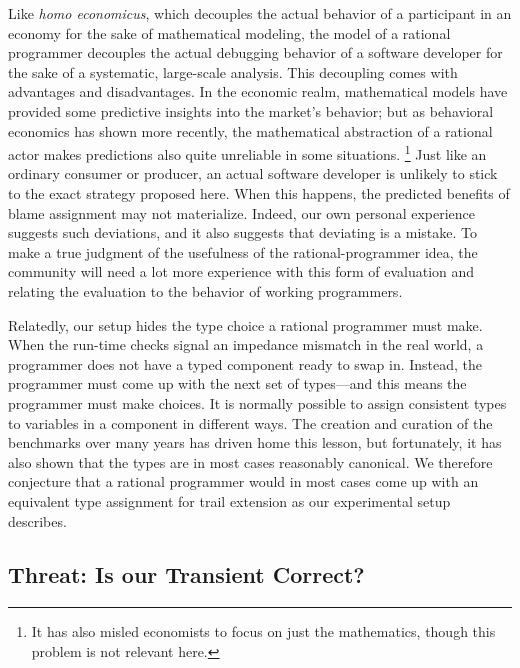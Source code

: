 Like {\em homo economicus\/}, which decouples the actual behavior of a
participant in an economy for the sake of mathematical modeling, the model of a
rational programmer decouples the actual debugging behavior of a software
developer for the sake of a systematic, large-scale analysis. This decoupling
comes with advantages and disadvantages. In the economic realm, mathematical models
have provided some predictive insights into the market's behavior; but as
behavioral economics has shown more recently, the mathematical abstraction of a
rational actor makes predictions also quite unreliable in some situations.
\footnote{It has also misled economists to focus on just the mathematics, though
this problem is not relevant here.}  Just like an ordinary consumer or producer,
an actual software developer is unlikely to stick to the exact strategy proposed
here. When this happens, the predicted benefits of blame assignment may not
materialize. Indeed, our own personal experience suggests such deviations, and
it also suggests that deviating is a mistake. To make a true judgment of the
usefulness of the rational-programmer idea, the community will need a lot more
experience with this form of evaluation and relating the evaluation to the
behavior of working programmers.

Relatedly, our setup hides the type choice a rational programmer must make. When the
run-time checks signal an impedance mismatch in the real world, a programmer
does not have a typed component ready to swap in. Instead, the programmer must
come up with the next set of types---and this means the programmer must make
choices. It is normally possible to assign consistent types to variables in a
component in different ways. The creation and curation of the benchmarks over
many years has driven home this lesson, but fortunately, it has also shown that
the types are in most cases reasonably canonical.  We therefore conjecture that
a rational programmer would in most cases come up with an equivalent type
assignment for trail extension as our experimental setup describes.


\subsection{Threat: Is our Transient Correct?}
\label{sec:threat:transient}

